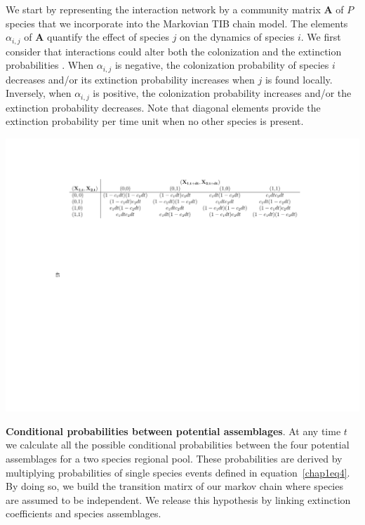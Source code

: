 We start by representing the interaction network by a community matrix $\mathbf{A}$ of $P$ species that we incorporate into the Markovian TIB chain model. The elements $\alpha_{i,j}$ of $\mathbf{A}$ quantify the effect of species $j$ on the dynamics of species $i$. We first consider that interactions could alter both the colonization and the extinction probabilities \citep{Gravel2011}. When $\alpha_{i,j}$ is negative, the colonization probability of species $i$ decreases and/or its extinction probability increases when $j$ is found locally. Inversely, when $\alpha_{i,j}$ is positive, the colonization probability increases and/or the extinction probability decreases. Note that diagonal elements provide the extinction probability per time unit when no other species is present.

\begin{table}[h!]
\centering
\includegraphics[scale=0.85]{./chapitre1/table1.pdf}
\caption[Conditional probabilities between potential assemblages]{\textbf{Conditional probabilities between potential assemblages}. At any time $t$ we calculate all the possible conditional probabilities between the four potential assemblages for a two species regional pool. These probabilities are derived by multiplying probabilities of single species events defined in equation~\eqref{chap1eq4}. By doing so, we build the transition matirx of our markov chain where species are assumed to be independent. We release this hypothesis by linking extinction coefficients and species assemblages.}
\label{tb1}
\end{table}

